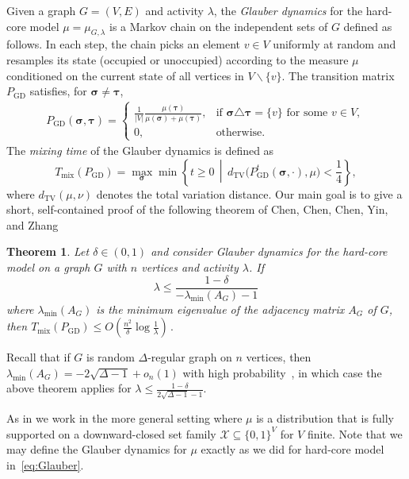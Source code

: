 \documentclass[10pt]{amsart}
\newtheorem{theorem}{Theorem}[section]
\newcommand{\sigmabf}{ \boldsymbol{\sigma} }
\newcommand{\taubf}{ \boldsymbol{\tau} }
\begin{document}
	
	Given a graph $G=(V,E)$ and activity $\lambda$, the \emph{Glauber dynamics} for the hard-core model $\mu=\mu_{G,\lambda}$ is a Markov chain on the independent sets of $G$ defined as follows. In each 
	step, the chain picks an element $v\in V$ uniformly at random and resamples its state (occupied or unoccupied) according to the measure $\mu$ conditioned on the current state of all vertices in $V\backslash\{v\}$.
	The transition matrix $P_{\mathrm{GD}}$ satisfies, for
	$\sigmabf\neq \taubf$,
	\begin{align}\label{eq:Glauber}
		P_{\mathrm{GD}}(\sigmabf,\taubf)
		=
		\begin{cases}
			\displaystyle
			\frac{1}{|V|}\frac{\mu(\taubf)}{\mu(\sigmabf)+\mu(\taubf)},
			&\text{if }\sigmabf\triangle \taubf=\{v\}\text{ for some }v\in V,\\[3mm]
			0,
			&\text{otherwise.}
		\end{cases}
	\end{align}
	The \emph{mixing time} of the Glauber dynamics is defined as
	\[
	T_{\mathrm{mix}}(P_{\mathrm{GD}})
	=
	\max_{\sigmabf}
	\min\left\{
	t\ge 0 \,\middle|\,
	d_{\mathrm{TV}}\bigl(P_{\mathrm{GD}}^t(\sigmabf,\cdot),\mu\bigr)<\frac14
	\right\},
	\]
	where
	\(
	d_{\mathrm{TV}}(\mu,\nu)
	\)
	denotes the total variation distance.
	Our main goal is to give a short, self-contained proof of the following theorem of Chen, Chen, Chen, Yin, and Zhang~\cite[Theorem 1.2]{chen2025rapid}
	
	\begin{theorem} \label{thm:hard-core-model}
		Let $\delta \in (0,1)$ and consider Glauber dynamics for the hard-core model on a graph $G$ with $n$ vertices and activity $\lambda$.  If $$\lambda \leq \frac{1 - \delta}{-\lambda_{\min}(A_G) - 1}$$
		where $\lambda_{\min}(A_G)$ is the minimum eigenvalue of the adjacency matrix $A_G$ of $G$, then $T_{\mathrm{mix}}(P_{\mathrm{GD}}) \leq O(\frac{n^2}{\delta} \log \frac{1}{\lambda})\,.$
	\end{theorem}
	Recall that if $G$ is random $\Delta$-regular graph on $n$ vertices, then $\lambda_{\min}(A_G)=-2\sqrt{\Delta-1} +o_n(1)$ with high probability~\cite{friedman2008proof}, in which case the above theorem applies for $\lambda\leq \frac{1-\delta}{2\sqrt{\Delta-1}-1}$. 
	
	As in \cite{chen2025rapid} we work in the more general setting where $\mu$ is a distribution that is fully supported on a downward-closed set family $\mathcal{X} \subseteq \{0, 1\}^V$ for $V$ finite. Note that we may define the Glauber dynamics for $\mu$ exactly as we did for hard-core model in~\eqref{eq:Glauber}.
	
\end{document}
